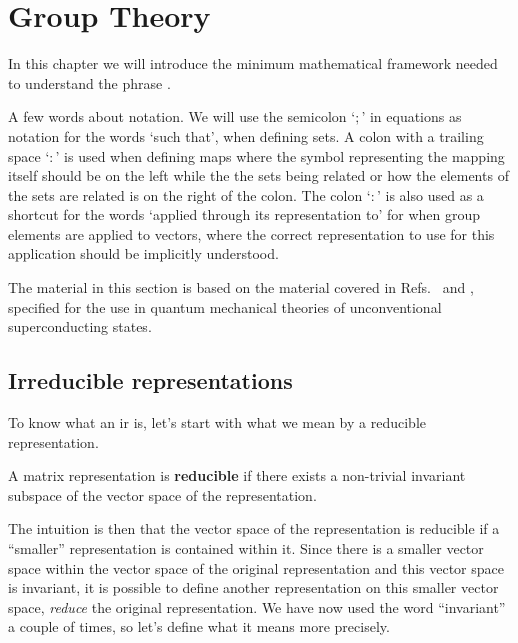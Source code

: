 \chapter{Group Theory}
\label{chap:Group}
%
\noindent In this chapter we will introduce the minimum mathematical framework needed to
understand the phrase .

A few words about notation. We will use the semicolon `$;$' in equations as notation for the words `such that', \eg when defining sets.
A colon with a trailing space `$\colon$' is used when defining maps where the symbol representing the mapping itself should be on the left while the the sets
being related or how the elements of the sets are related is on the right of the colon. The colon `$:$' is also used as a shortcut for the
words `applied through its representation to' for when group elements are applied to vectors, where the correct representation to use
for this application should be implicitly understood.

The material in this section is based on the material covered in Refs.~\cite{Inui90} and \cite{NegeleOrland98}, specified for the use in
quantum mechanical theories of unconventional superconducting states.

\section{Irreducible representations}

To know what an \ac{ir} is, let's start with what we mean by a reducible representation.
\begin{defi}
    A matrix representation is \textbf{reducible} if there exists a non-trivial invariant subspace of the vector space of the representation.
\end{defi}
The intuition is then that the vector space of the representation is reducible if a ``smaller'' representation is contained within it. Since
there is a smaller vector space within the vector space of the original representation and this vector space is invariant, it is possible
to define another representation on this smaller vector space, \ie\emph{reduce} the original representation. We have now used the word
``invariant'' a couple of times, so let's define what it means more precisely.

